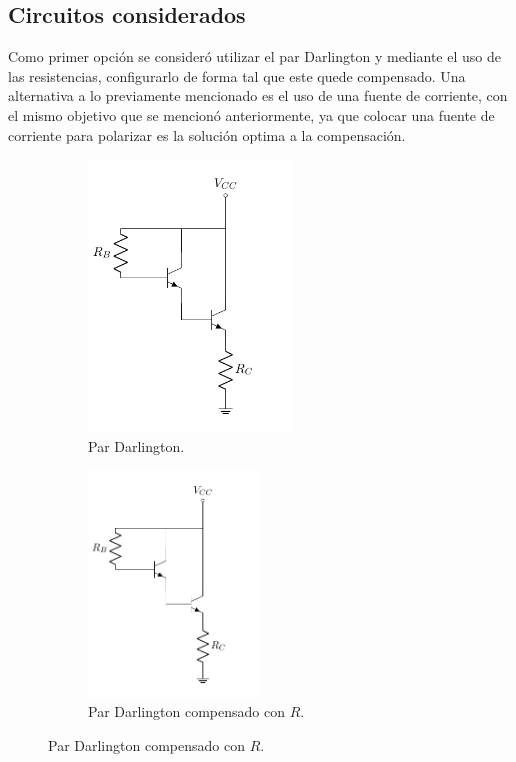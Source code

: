 \subsection{Circuitos considerados}
Como primer opción se consideró utilizar el par Darlington y mediante el uso de las resistencias, configurarlo de forma tal que este quede compensado. Una alternativa a lo previamente mencionado es el uso de una fuente de corriente, con el mismo objetivo que se mencionó anteriormente, ya que colocar una fuente de corriente para polarizar es la solución optima a la compensación.
\begin{figure}[H]
\centering
\begin{subfigure}{.\textwidth}
\centering
	\includegraphics[width=0.6\textwidth, page=1]{Imagenes/ParDarlington.pdf}
	\caption{Par Darlington.}
	\label{fig:pardar1}
\end{subfigure}
\begin{subfigure}{.5\textwidth}
\centering
	\includegraphics[width=0.5\textwidth, page=2]{Imagenes/ParDarlington.pdf}
	\caption{Par Darlington compensado con $R$.}
	\label{fig:pardar2}
\end{subfigure}


\end{figure}
